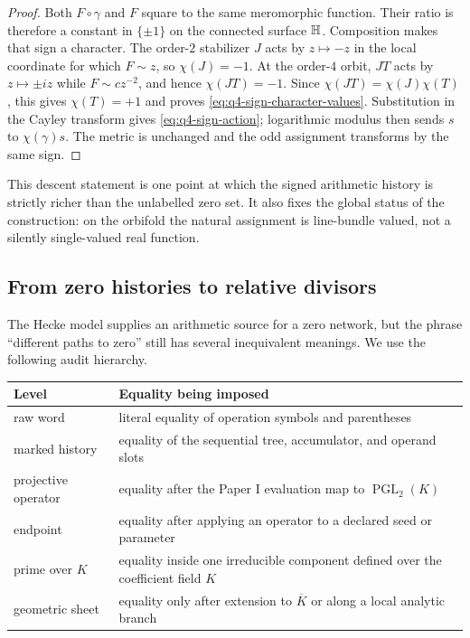 \begin{proof}
Both $F\circ\gamma$ and $F$ square to the same meromorphic function.  Their ratio
is therefore a constant in $\{\pm1\}$ on the connected surface $\mathbb{H}$.  Composition
makes that sign a character.  The order-$2$ stabilizer $J$ acts by $z\mapsto-z$
in the local coordinate for which $F\sim z$, so $\chi(J)=-1$.  At the order-$4$
orbit, $JT$ acts by $z\mapsto\pm iz$ while $F\sim cz^{-2}$, and hence
$\chi(JT)=-1$.  Since $\chi(JT)=\chi(J)\chi(T)$, this gives $\chi(T)=+1$ and proves
\eqref{eq:q4-sign-character-values}.  Substitution in the Cayley transform gives
\eqref{eq:q4-sign-action}; logarithmic modulus then
sends $s$ to $\chi(\gamma)s$.  The metric is unchanged and the odd assignment
transforms by the same sign.
\end{proof}

This descent statement is one point at which the signed arithmetic history is
strictly richer than the unlabelled zero set.  It also fixes the global status of
the construction: on the orbifold the natural assignment is line-bundle valued,
not a silently single-valued real function.

\subsection{From zero histories to relative divisors}

The Hecke model supplies an arithmetic source for a zero network, but the phrase
``different paths to zero'' still has several inequivalent meanings.  We use the
following audit hierarchy.

\begin{center}
\small
\begin{tabular}{p{}p{}}
\toprule
Level & Equality being imposed \\
\midrule
raw word & literal equality of operation symbols and parentheses \\
marked history & equality of the sequential tree, accumulator, and operand slots \\
projective operator & equality after the Paper I evaluation map to
$\operatorname{PGL}_2(K)$ \\
endpoint & equality after applying an operator to a declared seed or parameter \\
prime over $K$ & equality inside one irreducible component defined over
the coefficient field $K$ \\
geometric sheet & equality only after extension to $\overline K$ or along a local
analytic branch \\
\bottomrule
\end{tabular}
\end{center}

